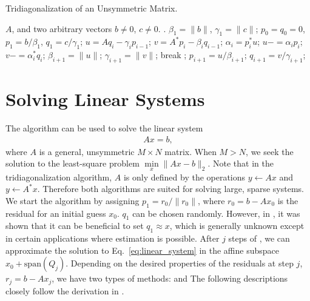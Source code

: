\documentclass[10pt,letterpaper]{article}
\newcommand{\alg}[1]{\textproc{#1}}
\def\alfa{\alpha}
\def\gama{\gamma}
\def\Span{\text{span}}
\begin{document}
\begin{algorithm}[H]
\caption{Tridiagonalization of an Unsymmetric Matrix.}
\label{Alg:Tridiagonalization}
\begin{algorithmic}[1]
\Require $A$, and two arbitrary vectors $b \neq 0$, $c \neq 0$. 
. 
\State $\beta_1 = \|b\|$, $\gama_1 = \|c\|$;
\State $p_0 = q_0 = 0$, $p_1 = b/\beta_1$, $q_1 = c/\gama_1$;
    \State $u = A   q_i - \gama_i p_{i-1}$;
    \State $v = A^* p_i - \beta_i q_{i-1}$;
    \State $\alfa_i = p_i^* u$;
    \State $u -= \alfa_i   p_i$; 
    \State $v -= \alfa_i^* q_i$; 
    \State $\beta_{i+1} = \|u\|$; 
    \State $\gama_{i+1} = \|v\|$; 
    \If{$\beta_{i+1} = 0\,\,\textbf{or} \,\,\gama_{i+1} = 0$}
        \State break ; 
    \Else
        \State $p_{i+1} = u / \beta_{i+1}$;  
        \State $q_{i+1} = v / \gama_{i+1}$;  
    \EndIf
\EndFor
\EndFunction
\end{algorithmic}
\end{algorithm}

\section{Solving Linear Systems}
The algorithm  can be used to solve the linear system
\begin{align} 
    A x = b, \label{eq:linear_system}
\end{align}
where $A$ is a general, unsymmetric $M\times N$ matrix. When $M > N$, 
we seek the solution to the least-square problem 
$\min\limits_x \|A x - b \|_2$. Note that in the tridiagonalization 
algorithm, $A$ is only defined by the operations $y \leftarrow Ax$ 
and $y \leftarrow A^* x$. Therefore both algorithms are suited for
solving large, sparse systems.\\

We start the algorithm by assigning $p_1 = r_0 / \|r_0\|$, where 
$r_0 = b - A x_0$ is the residual for an initial guess $x_0$.
$q_1$ can be chosen randomly. However, in \cite{reichel:2008}, it was
shown that it can be beneficial to set $q_1 \approx x$, which is 
generally unknown except in certain applications where estimation is
possible. After $j$ steps of , we can approximate 
the solution to Eq.~\eqref{eq:linear_system} in the affine subspace 
$x_0 + \Span(Q_j)$. Depending on the desired properties of the residuals
at step $j$, $r_j = b - A x_j$, we have two types of methods: 
\alg{USYMLQ} and \alg{USYMQR} The following descriptions closely follow
the derivation in \cite{saunders:1988}.
\end{document}
